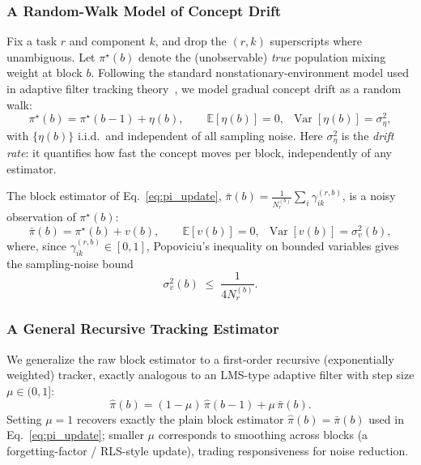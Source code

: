 ﻿\documentclass[12pt,a4paper]{article}
\begin{document}
\subsubsection{A Random-Walk Model of Concept Drift}

Fix a task $r$ and component $k$, and drop the $(r,k)$ superscripts where
unambiguous. Let $\pi^\star(b)$ denote the (unobservable) \emph{true}
population mixing weight at block $b$. Following the standard
nonstationary-environment model used in adaptive filter tracking
theory~\cite{WidrowStearns1985}, we model gradual concept drift as a random
walk:
\begin{equation}
\pi^\star(b) = \pi^\star(b-1) + \eta(b), \qquad \mathbb{E}[\eta(b)]=0,\ \; \operatorname{Var}[\eta(b)]=\sigma_\eta^2,
	\label{eq:rw_model}
\end{equation}
with $\{\eta(b)\}$ i.i.d.\ and independent of all sampling noise. Here
$\sigma_\eta^2$ is the \emph{drift rate}: it quantifies how fast the concept
moves per block, independently of any estimator.

The block estimator of Eq.~\eqref{eq:pi_update},
$\bar\pi(b)=\frac{1}{N_r^{(b)}}\sum_i\gamma_{ik}^{(r,b)}$, is a noisy
observation of $\pi^\star(b)$:
\begin{equation}
\bar\pi(b) = \pi^\star(b) + v(b), \qquad \mathbb{E}[v(b)]=0,\ \; \operatorname{Var}[v(b)]=\sigma_v^2(b),
	\label{eq:obs_model}
\end{equation}
where, since $\gamma_{ik}^{(r,b)}\in[0,1]$, Popoviciu's inequality on
bounded variables gives the sampling-noise bound
\begin{equation}
	\sigma_v^2(b) \;\leq\; \frac{1}{4N_r^{(b)}}.
	\label{eq:sigma_v_bound}
\end{equation}

\subsubsection{A General Recursive Tracking Estimator}

We generalize the raw block estimator to a first-order recursive
(exponentially weighted) tracker, exactly analogous to an LMS-type adaptive
filter with step size $\mu\in(0,1]$:
\begin{equation}
	\hat\pi(b) = (1-\mu)\,\hat\pi(b-1) + \mu\,\bar\pi(b).
	\label{eq:ewma_tracker}
\end{equation}
Setting $\mu=1$ recovers exactly the plain block estimator
$\hat\pi(b)=\bar\pi(b)$ used in Eq.~\eqref{eq:pi_update}; smaller $\mu$
corresponds to smoothing across blocks (a forgetting-factor / RLS-style
update), trading responsiveness for noise reduction.
\end{document}
